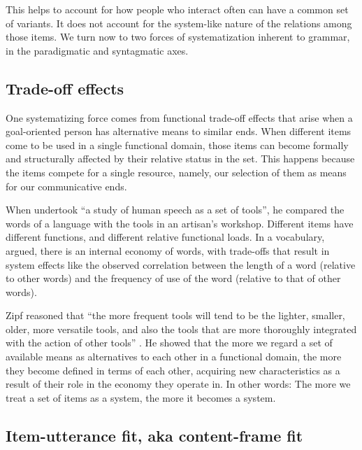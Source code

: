 This helps to account for how people who interact often
can have a common set of variants. It does not account for the 
system-like nature of the relations among those items. We 
turn now to two forces of systematization inherent 
to grammar, in the paradigmatic and syntagmatic axes.



\subsection{Trade-off effects}
\label{tradeoff}

One systematizing force comes from functional trade-off effects that 
arise when a goal-oriented person has alternative means to similar ends. When different items come to be used 
in a single functional domain, those items can become formally and 
structurally affected by their relative status in the set. This happens 
because the items compete for a single resource, namely, our selection of 
them as means for our communicative ends. 



When \citet{zipf_human_1949} undertook ``a study of human speech as a set of 
tools'', he compared the words of a language with the tools in an 
artisan's workshop. Different items have different functions, and different relative functional loads. In a vocabulary, \citet[21]{zipf_human_1949} 
argued, there is an internal economy of words, with trade-offs 
that result in system effects like the observed correlation between 
the length of a word (relative to other words) and the frequency of use 
of the word (relative to that of other words). 



Zipf reasoned that ``the more frequent tools will tend to be the lighter, 
smaller, older, more versatile tools, and also the tools that are more 
thoroughly integrated with the action of other tools'' \citep[73]{zipf_human_1949}. He 
showed that the more we regard a set of available means as alternatives 
to each other in a functional domain, the more they become defined in 
terms of each other, acquiring new characteristics as a result of their 
role in the economy they operate in. In other words: The more we 
treat a set of items as a system, the more it becomes a system.



\subsection{Item-utterance fit, aka content-frame fit}
\label{itemutterance}

